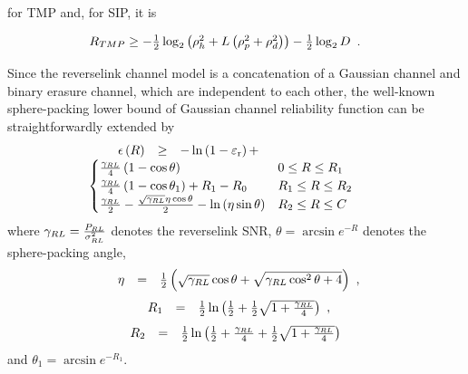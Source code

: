 \documentclass[10pt,fleqn, twocolumn]{IEEEtran}
\begin{document}
\noindent for TMP and, for SIP, it is

\begin{equation}\hspace{-0.3in}
\begin{array}{l}
R_{\mbox{\tiny
TMP}}\geq-\frac{1}{2}\log_{2}\left(\rho_{h}^2+L\left(\rho_{p}^2+\rho_{d}^2\right)\right)-\frac{1}{2}\log_{2}D
\end{array}.
\end{equation}

Since the reverselink channel model is a concatenation of a
Gaussian channel and binary erasure channel, which are independent
to each other, the well-known sphere-packing lower bound of
Gaussian channel reliability function can be straightforwardly
extended by
\begin{equation}\hspace{-0.0in}
\begin{array}{lcl}
\epsilon\left(R\right)&\geq&-\ln\left(1-\varepsilon_{\rm
r}\right)+\\
&&\hspace{-1.0in}
\begin{cases}
\frac{\gamma_{\mbox{\tiny RL}}}{4}\left(1-\cos\theta\right) &
0\leq R\leq R_{1} \\
\frac{\gamma_{\mbox{\tiny RL}}}{4}\left(1-\cos\theta_{1}\right)
+R_{1}-R_{0}&
R_{1}\leq R\leq R_{2} \\
\frac{\gamma_{\mbox{\tiny RL}}}{2}-\frac{\sqrt{\gamma_{\mbox{\tiny
RL}}}\eta\cos\theta}{2}-\ln\left(\eta\sin\theta\right) &R_{2}\leq
R\leq C
\end{cases}
\end{array}
\end{equation}
\noindent where $\gamma_{\mbox{\tiny RL}}=\frac{P_{\mbox{\tiny
RL}}}{\sigma^2_{\mbox{\tiny RL}}}$ denotes the reverselink SNR,
$\theta=\arcsin e^{-R}$ denotes the sphere-packing angle,
\begin{equation}\hspace{-0.0in}
\begin{array}{rcl}
\eta&=&\frac{1}{2}\left(\sqrt{\gamma_{\mbox{\tiny
RL}}}\cos\theta+\sqrt{\gamma_{\mbox{\tiny
RL}}\cos^2\theta+4}\right)
\end{array},
\end{equation}
\begin{equation}\hspace{-0.0in}
\begin{array}{rcl}
R_{1}&=&\frac{1}{2}\ln\left(\frac{1}{2}+\frac{1}{2}\sqrt{1+\frac{\gamma_{\mbox{\tiny
RL}}}{4}}\right)
\end{array},
\end{equation}
\begin{equation}\hspace{-0.0in}
\begin{array}{rcl}
R_{2}&=&\frac{1}{2}\ln\left(\frac{1}{2}+\frac{\gamma_{\mbox{\tiny
RL}}}{4}+\frac{1}{2}\sqrt{1+\frac{\gamma_{\mbox{\tiny
RL}}}{4}}\right)
\end{array}
\end{equation}
\noindent and $\theta_{1}=\arcsin e^{-R_{1}}$.
\end{document}
